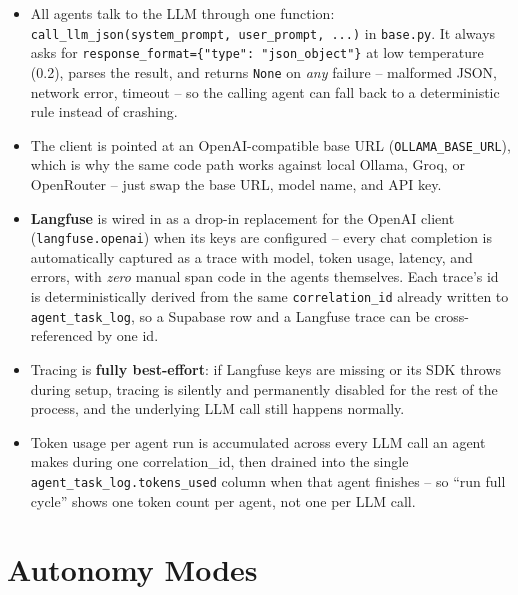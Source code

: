 \documentclass[11pt,a4paper]{article}
\begin{document}
\begin{itemize}[itemsep=2pt]
\item All agents talk to the LLM through one function: \texttt{call\_llm\_json(system\_prompt,
user\_prompt, ...)} in \texttt{base.py}. It always asks for
\texttt{response\_format=\{"type": "json\_object"\}} at low temperature (0.2), parses the
result, and returns \texttt{None} on \emph{any} failure -- malformed JSON, network error,
timeout -- so the calling agent can fall back to a deterministic rule instead of crashing.
\item The client is pointed at an OpenAI-compatible base URL (\texttt{OLLAMA\_BASE\_URL}),
which is why the same code path works against local Ollama, Groq, or OpenRouter -- just swap
the base URL, model name, and API key.
\item \textbf{Langfuse} is wired in as a drop-in replacement for the OpenAI client
(\texttt{langfuse.openai}) when its keys are configured -- every chat completion is
automatically captured as a trace with model, token usage, latency, and errors, with
\emph{zero} manual span code in the agents themselves. Each trace's id is deterministically
derived from the same \texttt{correlation\_id} already written to \texttt{agent\_task\_log},
so a Supabase row and a Langfuse trace can be cross-referenced by one id.
\item Tracing is \textbf{fully best-effort}: if Langfuse keys are missing or its SDK throws
during setup, tracing is silently and permanently disabled for the rest of the process, and
the underlying LLM call still happens normally.
\item Token usage per agent run is accumulated across every LLM call an agent makes during one
correlation\_id, then drained into the single \texttt{agent\_task\_log.tokens\_used} column
when that agent finishes -- so ``run full cycle'' shows one token count per agent, not one per
LLM call.
\end{itemize}

\section{Autonomy Modes}
\end{document}
